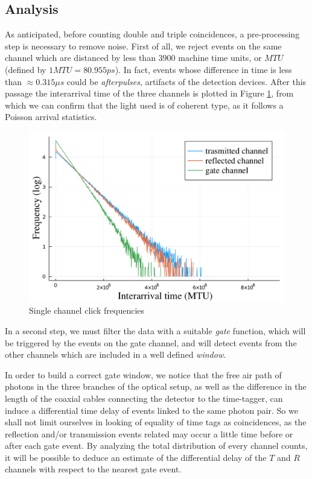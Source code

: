 \documentclass[10pt, final]{article}
\begin{document}
\begin{multicols}{2}
\subsection*{Analysis}
As anticipated, before counting double and triple coincidences, a pre-processing step is necessary to remove noise. First of all, we reject events on the same channel which are distanced by less than $3900$ machine time units, or $MTU$ (defined by $1 MTU = 80.955 ps$). In fact, events whose difference in time is less than $\approx 0.315 \mu s$ could be \emph{afterpulses}, artifacts of the detection devices. After this passage the interarrival time of the three channels is plotted in Figure \ref{exps}, from which we can confirm that the light used is of coherent type, as it follows a Poisson arrival statistics.
\begin{mdframed}
    \begin{figure}[H]
        \centering
        \includegraphics[width = \textwidth]{../images/single_chan.pdf}
        \caption{Single channel click frequencies}
        \label{exps}
    \end{figure}
\end{mdframed}

In a second step, we must filter the data with a suitable \emph{gate} function, which will be triggered by the events on the gate channel, and will detect events from the other channels which are included in a well defined \emph{window}. 

In order to build a correct gate window, we notice that the free air path of photons in the three branches of the optical setup, as well as the difference in the length of the coaxial cables connecting the detector to the time-tagger, can induce a differential time delay of events linked to the same photon pair. So we shall not limit ourselves in looking of equality of time tags as coincidences, as the reflection and/or transmission events related may occur a little time before or after each gate event. By analyzing the total distribution of every channel counts, it will be possible to deduce an estimate of the differential delay of the $T$ and $R$ channels with respect to the nearest gate event.


\end{multicols}
\end{document}

